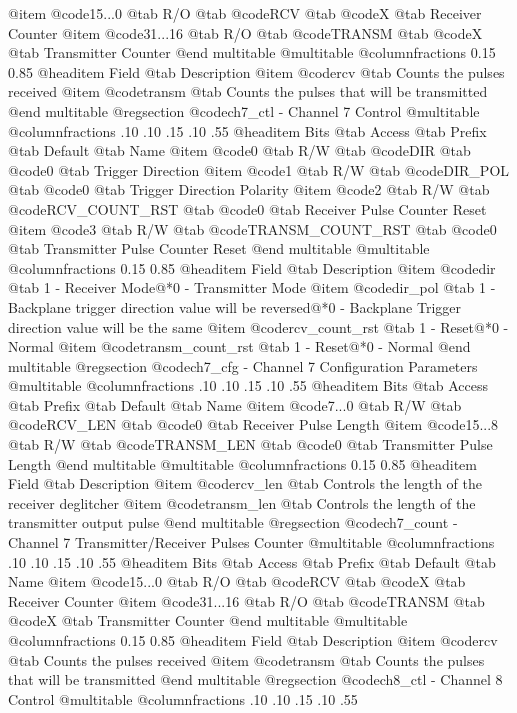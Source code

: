 @item @code{15...0}
@tab R/O @tab
@code{RCV}
@tab @code{X} @tab 
Receiver Counter
@item @code{31...16}
@tab R/O @tab
@code{TRANSM}
@tab @code{X} @tab 
Transmitter Counter
@end multitable
@multitable @columnfractions 0.15 0.85
@headitem Field @tab Description
@item @code{rcv} @tab Counts the pulses received
@item @code{transm} @tab Counts the pulses that will be transmitted
@end multitable
@regsection @code{ch7_ctl} - Channel 7 Control
@multitable @columnfractions .10 .10 .15 .10 .55
@headitem Bits @tab Access @tab Prefix @tab Default @tab Name
@item @code{0}
@tab R/W @tab
@code{DIR}
@tab @code{0} @tab 
Trigger Direction
@item @code{1}
@tab R/W @tab
@code{DIR_POL}
@tab @code{0} @tab 
Trigger Direction Polarity
@item @code{2}
@tab R/W @tab
@code{RCV_COUNT_RST}
@tab @code{0} @tab 
Receiver Pulse Counter Reset
@item @code{3}
@tab R/W @tab
@code{TRANSM_COUNT_RST}
@tab @code{0} @tab 
Transmitter Pulse Counter Reset
@end multitable
@multitable @columnfractions 0.15 0.85
@headitem Field @tab Description
@item @code{dir} @tab 1 - Receiver Mode@*0 - Transmitter Mode
@item @code{dir_pol} @tab 1 - Backplane trigger direction value will be reversed@*0 - Backplane Trigger direction value will be the same
@item @code{rcv_count_rst} @tab 1 - Reset@*0 - Normal
@item @code{transm_count_rst} @tab 1 - Reset@*0 - Normal
@end multitable
@regsection @code{ch7_cfg} - Channel 7 Configuration Parameters
@multitable @columnfractions .10 .10 .15 .10 .55
@headitem Bits @tab Access @tab Prefix @tab Default @tab Name
@item @code{7...0}
@tab R/W @tab
@code{RCV_LEN}
@tab @code{0} @tab 
Receiver Pulse Length
@item @code{15...8}
@tab R/W @tab
@code{TRANSM_LEN}
@tab @code{0} @tab 
Transmitter Pulse Length
@end multitable
@multitable @columnfractions 0.15 0.85
@headitem Field @tab Description
@item @code{rcv_len} @tab Controls the length of the receiver deglitcher
@item @code{transm_len} @tab Controls the length of the transmitter output pulse
@end multitable
@regsection @code{ch7_count} - Channel 7 Transmitter/Receiver Pulses Counter
@multitable @columnfractions .10 .10 .15 .10 .55
@headitem Bits @tab Access @tab Prefix @tab Default @tab Name
@item @code{15...0}
@tab R/O @tab
@code{RCV}
@tab @code{X} @tab 
Receiver Counter
@item @code{31...16}
@tab R/O @tab
@code{TRANSM}
@tab @code{X} @tab 
Transmitter Counter
@end multitable
@multitable @columnfractions 0.15 0.85
@headitem Field @tab Description
@item @code{rcv} @tab Counts the pulses received
@item @code{transm} @tab Counts the pulses that will be transmitted
@end multitable
@regsection @code{ch8_ctl} - Channel 8 Control
@multitable @columnfractions .10 .10 .15 .10 .55
